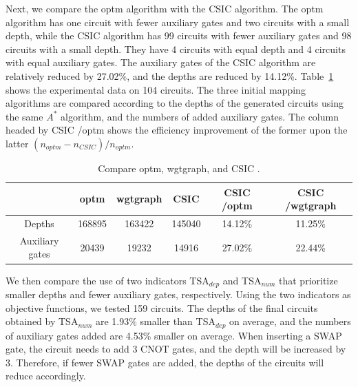 \documentclass[runningheads]{llncs}
\begin{document}
Next, we compare the optm algorithm with the CSIC algorithm. The optm algorithm has one circuit with fewer auxiliary gates and two circuits with a small depth, while the CSIC algorithm has 99 circuits with fewer auxiliary gates and 98 circuits with a small depth.  
They have 4 circuits with equal depth and 4 circuits with equal auxiliary gates. The auxiliary gates of the CSIC algorithm are relatively reduced by 27.02\%, and the depths are reduced by 14.12\%. Table~\ref{tab1} shows the experimental data on 104 circuits. The three initial mapping algorithms are compared according to the depths of the generated circuits using the same $A^{*}$ algorithm, and the numbers of added auxiliary gates. The column headed by CSIC /optm  shows the efficiency improvement of the former upon the latter $(n_{optm}-n_{CSIC })/n_{optm}$.
\begin{table}
	\begin{center}  
	\begin{tabular}{|c|c|c|c|c|c|}
	\hline
	    	&  optm & wgtgraph &CSIC & CSIC /optm & CSIC /wgtgraph\\
	\hline
	 Depths 	&	168895	&   163422	&  145040 	& 14.12\%  &11.25\%   \\
	\hline
	 Auxiliary gates 	&	20439	&  19232 	&  14916 & 27.02\% 	&  22.44\%  \\
	\hline
	\end{tabular} 
	\end{center} 
	\caption{Compare optm, wgtgraph, and CSIC .}
	\label{tab1}
	\end{table}

	We then compare the use of two indicators TSA$_{dep}$ and TSA$_{num}$ that prioritize smaller depths and fewer auxiliary gates, respectively. Using the two indicators  as objective functions, we tested 159 circuits. The depths of the final circuits obtained by TSA$_{num}$ are 1.93\% smaller than TSA$_{dep}$ on average, and the numbers of auxiliary gates added are 4.53\% smaller on average. When inserting a SWAP gate, the circuit needs to add 3 CNOT gates, and the depth will be increased by 3.  Therefore, if fewer SWAP gates are added, the depths of the circuits will reduce accordingly. 
\end{document}
